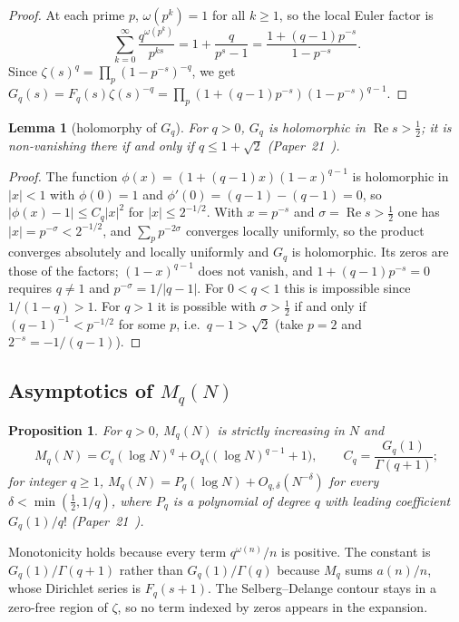\documentclass[11pt]{amsart}
\newtheorem{proposition}[theorem]{Proposition}
\newtheorem{lemma}[theorem]{Lemma}
\theoremstyle{definition}
\theoremstyle{remark}
\renewcommand{\Re}{\operatorname{Re}}
\newcommand{\half}{\tfrac{1}{2}}
\newcommand{\om}{\omega}
\begin{document}
\begin{proof}
At each prime $p$, $\om(p^k) = 1$ for all $k\ge 1$, so the local Euler factor is
\[
  \sum_{k=0}^\infty \frac{q^{\om(p^k)}}{p^{ks}}
  = 1 + \frac{q}{p^s-1}
  = \frac{1+(q-1)p^{-s}}{1-p^{-s}}.
\]
Since $\zeta(s)^q = \prod_p (1-p^{-s})^{-q}$, we get
$G_q(s)=F_q(s)\zeta(s)^{-q}=\prod_p(1+(q-1)p^{-s})(1-p^{-s})^{q-1}$.
\end{proof}

\begin{lemma}[holomorphy of $G_q$]
\label{lem:Gq}
For $q>0$, $G_q$ is holomorphic in $\Re s>\half$; it is non-vanishing there if and only
if $q\le1+\sqrt2$ \textup{(}Paper~21~\cite[Lemma~2.1]{P21}\textup{)}.
\end{lemma}

\begin{proof}
The function $\phi(x)=(1+(q-1)x)(1-x)^{q-1}$ is holomorphic in $|x|<1$ with $\phi(0)=1$
and $\phi'(0)=(q-1)-(q-1)=0$, so $|\phi(x)-1|\le C_q|x|^2$ for $|x|\le2^{-1/2}$. With
$x=p^{-s}$ and $\sigma=\Re s>\half$ one has $|x|=p^{-\sigma}<2^{-1/2}$, and
$\sum_pp^{-2\sigma}$ converges locally uniformly, so the product converges absolutely and
locally uniformly and $G_q$ is holomorphic. Its zeros are those of the factors; $(1-x)^{q-1}$
does not vanish, and $1+(q-1)p^{-s}=0$ requires $q\ne1$ and $p^{-\sigma}=1/|q-1|$. For
$0<q<1$ this is impossible since $1/(1-q)>1$. For $q>1$ it is possible with $\sigma>\half$
if and only if $(q-1)^{-1}<p^{-1/2}$ for some $p$, i.e.\ $q-1>\sqrt2$ (take $p=2$ and
$2^{-s}=-1/(q-1)$).
\end{proof}

\subsection{Asymptotics of $M_q(N)$}
\label{ss:zerosofzeros}

\begin{proposition}
\label{thm:Mk-monotone}
For $q>0$, $M_q(N)$ is strictly increasing in $N$ and
\[
  M_q(N)=C_q(\log N)^q+O_q\bigl((\log N)^{q-1}+1\bigr),\qquad C_q=\frac{G_q(1)}{\Gamma(q+1)};
\]
for integer $q\ge1$, $M_q(N)=P_q(\log N)+O_{q,\delta}(N^{-\delta})$ for every
$\delta<\min(\half,1/q)$, where $P_q$ is a polynomial of degree $q$ with leading coefficient
$G_q(1)/q!$ \textup{(}Paper~21~\cite[Prop.~3.1 and Thm.~9.1]{P21}\textup{)}.
\end{proposition}

Monotonicity holds because every term $q^{\om(n)}/n$ is positive. The constant is
$G_q(1)/\Gamma(q+1)$ rather than $G_q(1)/\Gamma(q)$ because $M_q$ sums $a(n)/n$, whose
Dirichlet series is $F_q(s+1)$. The Selberg--Delange contour stays in a zero-free region of
$\zeta$, so no term indexed by zeros appears in the expansion.
\end{document}
